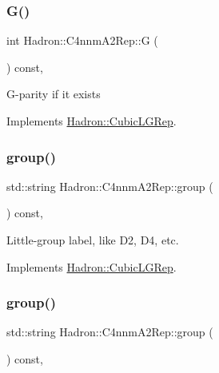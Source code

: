 \subsubsection{\texorpdfstring{G()}{G()}\hspace{0.1cm}{\footnotesize\ttfamily [2/2]}}
{\footnotesize\ttfamily int Hadron\+::\+C4nnm\+A2\+Rep\+::G (\begin{DoxyParamCaption}{ }\end{DoxyParamCaption}) const\hspace{0.3cm}{\ttfamily [inline]}, {\ttfamily [virtual]}}

G-\/parity if it exists 

Implements \mbox{\hyperlink{structHadron_1_1CubicLGRep_ace26f7b2d55e3a668a14cb9026da5231}{Hadron\+::\+Cubic\+L\+G\+Rep}}.

\mbox{\label{structHadron_1_1C4nnmA2Rep_ae6a2ff8ed8fcc3e34ed1e46e493195ed}} 
\subsubsection{\texorpdfstring{group()}{group()}\hspace{0.1cm}{\footnotesize\ttfamily [1/3]}}
{\footnotesize\ttfamily std\+::string Hadron\+::\+C4nnm\+A2\+Rep\+::group (\begin{DoxyParamCaption}{ }\end{DoxyParamCaption}) const\hspace{0.3cm}{\ttfamily [inline]}, {\ttfamily [virtual]}}

Little-\/group label, like D2, D4, etc. 

Implements \mbox{\hyperlink{structHadron_1_1CubicLGRep_a9bdb14b519a611d21379ed96a3a9eb41}{Hadron\+::\+Cubic\+L\+G\+Rep}}.

\mbox{\label{structHadron_1_1C4nnmA2Rep_ae6a2ff8ed8fcc3e34ed1e46e493195ed}} 
\subsubsection{\texorpdfstring{group()}{group()}\hspace{0.1cm}{\footnotesize\ttfamily [2/3]}}
{\footnotesize\ttfamily std\+::string Hadron\+::\+C4nnm\+A2\+Rep\+::group (\begin{DoxyParamCaption}{ }\end{DoxyParamCaption}) const\hspace{0.3cm}{\ttfamily [inline]}, {\ttfamily [virtual]}}

